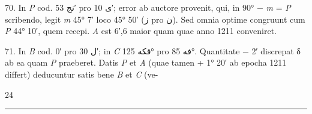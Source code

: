 \documentclass[11pt]{article}
\newcommand{\AbjadZero}{{\NallinoSigns\symbol{"E000}}}
\begin{document}
{\par\hangindent=12mm 70. In \textit{P} cod. \textarabic{نج} 53′ pro \textarabic{ى} 10′; error ab auctore provenit, qui, in 90° − \textit{m} = \textit{P} scribendo, legit \textit{m} 45° 7′ loco 45° 50′ (\textarabic{ز} pro \textarabic{ن}). Sed omnia optime congruunt cum \textit{P} 44° 10′, quem recepi. \textit{A} est 6′,6 maior quam quae anno 1211 conveniret.
\par\hangindent=12mm 71. In \textit{B} cod. \textarabic{\AbjadZero{}} 0′ pro \textarabic{ل} 30′; in \textit{C} \textarabic{قكه} 125° pro \textarabic{فه} 85°. Quantitate − 2′ discrepat δ ab ea quam \textit{P} praeberet. Datis \textit{P} et \textit{A} (quae tamen + 1° 20′ ab epocha 1211 differt) deducuntur satis bene \textit{B} et \textit{C} (ve-
\par}
\par\vfill\hfill 24
\clearpage
\noindent{}\par\vspace{-1mm}\noindent\rule{\textwidth}{.4pt}\par\vspace{2mm}
\end{document}
